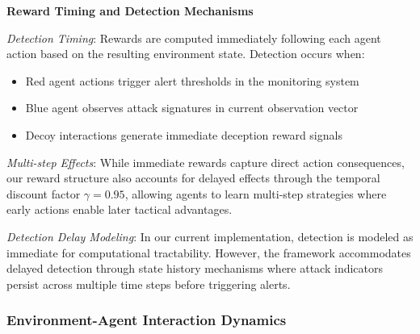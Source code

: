 \documentclass[12pt]{article}
\theoremstyle{definition}
\theoremstyle{plain}
\begin{document}
\textbf{Reward Timing and Detection Mechanisms}

\textit{Detection Timing}: Rewards are computed immediately following each agent action based on the resulting environment state. Detection occurs when:
\begin{itemize}
    \item Red agent actions trigger alert thresholds in the monitoring system
    \item Blue agent observes attack signatures in current observation vector
    \item Decoy interactions generate immediate deception reward signals
\end{itemize}

\textit{Multi-step Effects}: While immediate rewards capture direct action consequences, our reward structure also accounts for delayed effects through the temporal discount factor $\gamma = 0.95$, allowing agents to learn multi-step strategies where early actions enable later tactical advantages.

\textit{Detection Delay Modeling}: In our current implementation, detection is modeled as immediate for computational tractability. However, the framework accommodates delayed detection through state history mechanisms where attack indicators persist across multiple time steps before triggering alerts.

\subsubsection{Environment-Agent Interaction Dynamics}
\end{document}
